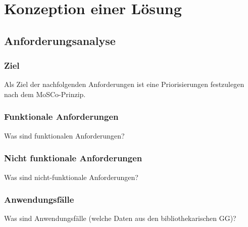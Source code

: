 \chapter{Konzeption einer Lösung}

\section{Anforderungsanalyse}

\subsection{Ziel}
Als Ziel der nachfolgenden Anforderungen ist  eine Priorisierungen festzulegen nach dem MoSCo-Prinzip.
\subsection{Funktionale Anforderungen}
Was sind funktionalen Anforderungen?
\subsection{Nicht funktionale Anforderungen}
Was sind nicht-funktionale Anforderungen?
\subsection{Anwendungsfälle}
Was sind Anwendungsfälle (welche Daten aus den bibliothekarischen GG)? 
